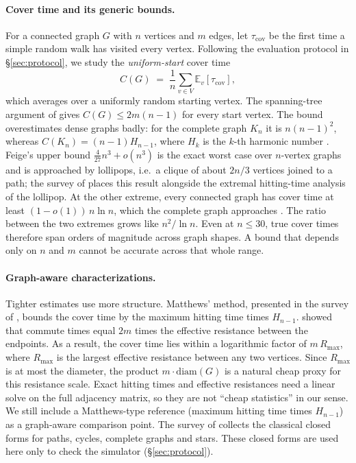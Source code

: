 \documentclass{article}
\newcommand{\Ccov}{C}
\newcommand{\diam}{\mathrm{diam}}
\begin{document}
\paragraph{Cover time and its generic bounds.}
For a connected graph $G$ with $n$ vertices and $m$ edges, let $\tau_{\mathrm{cov}}$ be the first time a simple random walk has visited every vertex. Following the evaluation protocol in \S\ref{sec:protocol}, we study the \emph{uniform-start} cover time
\begin{equation}
\Ccov(G) \;=\; \frac{1}{n}\sum_{v\in V}\mathbb{E}_v\!\left[\tau_{\mathrm{cov}}\right],
\end{equation}
which averages over a uniformly random starting vertex. The spanning-tree argument of \citet{Aleliunas1979RandomWU} gives $\Ccov(G)\le 2m(n-1)$ for every start vertex. The bound overestimates dense graphs badly: for the complete graph $K_n$ it is $n(n-1)^2$, whereas $\Ccov(K_n)=(n-1)H_{n-1}$, where $H_k$ is the $k$-th harmonic number \citep{Lovász2001RandomWO}. Feige's upper bound $\tfrac{4}{27}n^3+o(n^3)$ is the exact worst case over $n$-vertex graphs and is approached by lollipops, i.e.\ a clique of about $2n/3$ vertices joined to a path; the survey of \citet{Lovász2001RandomWO} places this result alongside the extremal hitting-time analysis of the lollipop. At the other extreme, every connected graph has cover time at least $(1-o(1))\,n\ln n$, which the complete graph approaches \citep{Feige1995ATL}. The ratio between the two extremes grows like $n^2/\ln n$. Even at $n\le 30$, true cover times therefore span orders of magnitude across graph shapes. A bound that depends only on $n$ and $m$ cannot be accurate across that whole range.

\paragraph{Graph-aware characterizations.}
Tighter estimates use more structure. Matthews' method, presented in the survey of \citet{Lovász2001RandomWO}, bounds the cover time by the maximum hitting time times $H_{n-1}$. \citet{Chandra1989TheER} showed that commute times equal $2m$ times the effective resistance between the endpoints. As a result, the cover time lies within a logarithmic factor of $m\,R_{\max}$, where $R_{\max}$ is the largest effective resistance between any two vertices. Since $R_{\max}$ is at most the diameter, the product $m\cdot\diam(G)$ is a natural cheap proxy for this resistance scale. Exact hitting times and effective resistances need a linear solve on the full adjacency matrix, so they are not ``cheap statistics'' in our sense. We still include a Matthews-type reference (maximum hitting time times $H_{n-1}$) as a graph-aware comparison point. The survey of \citet{Lovász2001RandomWO} collects the classical closed forms for paths, cycles, complete graphs and stars. These closed forms are used here only to check the simulator (\S\ref{sec:protocol}).
\end{document}
